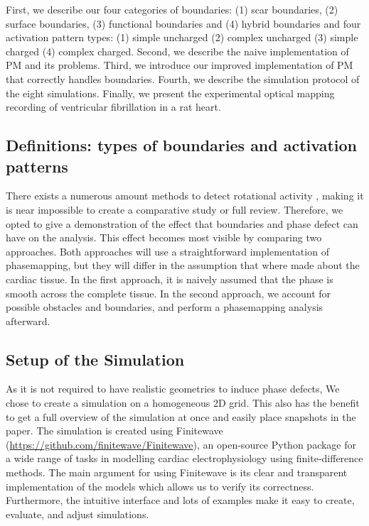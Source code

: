 \documentclass[twocolumn]{article}
\begin{document}
First, we describe our four categories of boundaries: (1) scar boundaries, (2) surface boundaries, (3) functional boundaries and (4) hybrid boundaries and four activation pattern types: (1) simple uncharged (2) complex uncharged (3) simple charged (4) complex charged.
Second, we describe the naive implementation of PM and its problems. Third, we introduce our improved implementation of PM that correctly handles boundaries. Fourth, we describe the simulation protocol of the eight simulations. Finally, we present the experimental optical mapping recording of ventricular fibrillation in a rat heart.
\subsection{Definitions: types of boundaries and activation patterns}


There exists a numerous amount methods to detect rotational activity \autocite{pikunov2023the, gurevich2019robust, li2020standardizing},
making it is near impossible to create a comparative study or full review.
Therefore, we opted to give a demonstration of the effect
that boundaries and phase defect can have on the analysis.
This effect becomes most visible by comparing two approaches.
Both approaches will use a straightforward implementation of phasemapping, but
they will differ in the assumption that where made about the cardiac tissue.
In the first approach, it is naively assumed
that the phase is smooth across the complete tissue.
In the second approach, we account for possible obstacles and boundaries,
and perform a phasemapping analysis afterward.

\subsection{Setup of the Simulation}

As it is not required to have realistic geometries to induce phase
defects, We chose to create a simulation on a homogeneous 2D grid. This
also has the benefit to get a full overview of the simulation at once
and easily place snapshots in the paper.
The simulation is created using Finitewave
(\url{https://github.com/finitewave/Finitewave}), an open-source Python
package for a wide range of tasks in modelling cardiac electrophysiology
using finite-difference methods. The main argument for using Finitewave
is its clear and transparent implementation of the models which allows
us to verify its correctness. Furthermore, the intuitive interface and
lots of examples make it easy to create, evaluate, and adjust
simulations.
\end{document}

